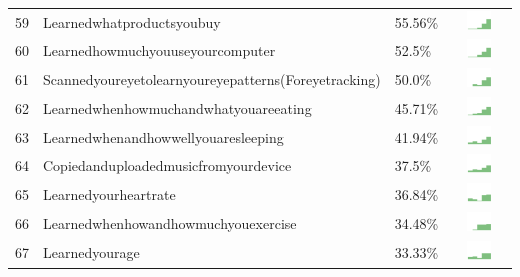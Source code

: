 \documentclass[a4paper,12pt]{article}
\begin{document}
\begin{longtable}{| p{0.5cm} | p{7cm} | p{1cm} | c |}
59 & Learnedwhatproductsyoubuy & 55.56\% & \includegraphics[width = 2cm, height = 0.5cm]{learnedwhatproductsyoubuyPUBLIC} \\  
60 & Learnedhowmuchyouuseyourcomputer & 52.5\% & \includegraphics[width = 2cm, height = 0.5cm]{learnedhowmuchyouuseyourcomputerPUBLIC} \\  
61 & Scannedyoureyetolearnyoureyepatterns(Foreyetracking) & 50.0\% & \includegraphics[width = 2cm, height = 0.5cm]{scannedyoureyetolearnyoureyepatterns(foreyetracking)PUBLIC} \\  
62 & Learnedwhenhowmuchandwhatyouareeating & 45.71\% & \includegraphics[width = 2cm, height = 0.5cm]{learnedwhenhowmuchandwhatyouareeatingPUBLIC} \\  
63 & Learnedwhenandhowwellyouaresleeping & 41.94\% & \includegraphics[width = 2cm, height = 0.5cm]{learnedwhenandhowwellyouaresleepingPUBLIC} \\  
64 & Copiedanduploadedmusicfromyourdevice & 37.5\% & \includegraphics[width = 2cm, height = 0.5cm]{copiedanduploadedmusicfromyourdevicePUBLIC} \\  
65 & Learnedyourheartrate & 36.84\% & \includegraphics[width = 2cm, height = 0.5cm]{learnedyourheartratePUBLIC} \\  
66 & Learnedwhenhowandhowmuchyouexercise & 34.48\% & \includegraphics[width = 2cm, height = 0.5cm]{learnedwhenhowandhowmuchyouexercisePUBLIC} \\  
67 & Learnedyourage & 33.33\% & \includegraphics[width = 2cm, height = 0.5cm]{learnedyouragePUBLIC} \\  

\end{longtable}
\end{document}
